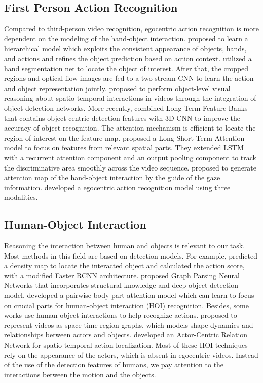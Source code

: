 \documentclass[letterpaper]{article} \usepackage{aaai20}  \usepackage{times}  \usepackage{helvet} \usepackage{courier}  \usepackage[hyphens]{url}  \usepackage{graphicx} \urlstyle{rm} \def\UrlFont{\rm}  \usepackage{graphicx}  \frenchspacing  \setlength{\pdfpagewidth}{8.5in}  \setlength{\pdfpageheight}{11in}  \usepackage{amsfonts,amssymb}
\begin{document}
\subsection{First Person Action Recognition}
Compared to third-person video recognition, egocentric action recognition is more dependent on the modeling of the hand-object interaction.  \cite{fathi2011understanding} proposed to learn a hierarchical model which exploits the consistent appearance of objects, hands, and actions and refines the object prediction based on action context.  \cite{ma2016going} utilized a hand segmentation net to locate the object of interest. After that, the cropped regions and optical flow images are fed to a two-stream CNN to learn the action and object representation jointly. \cite{Baradel2018ObjectLV} proposed to perform object-level visual reasoning about spatio-temporal interactions in videos through the integration of object detection networks.  More recently, \cite{Wu2018LongTermFB} combined Long-Term Feature Banks that contains object-centric detection features with 3D CNN to improve the accuracy of object recognition. The attention mechanism is efficient to locate the region of interest on the feature map.   \cite{Sudhakaran_2019_CVPR} proposed a Long Short-Term Attention model to focus on features from relevant spatial parts. They extended LSTM with a recurrent attention component and an output pooling component to track the discriminative area smoothly across the video sequence.  \cite{li2018eye} proposed to generate attention map of the hand-object interaction by the guide of the gaze information.  \cite{Kazakos_2019_ICCV} developed a egocentric action recognition model using three modalities.

\subsection{Human-Object Interaction}
Reasoning the interaction between human and objects is relevant to our task. Most methods in this field are based on detection models. For example,  \cite{gkioxari2018detecting} predicted a density map to locate the interacted object and calculated the action score, with a modified Faster RCNN architecture. \cite{qi2018learning} proposed Graph Parsing Neural Networks that incorporates structural knowledge and deep object detection model.  \cite{fang2018pairwise} developed a pairwise body-part attention model which can learn to focus on crucial parts for human-object interaction (HOI) recognition.  
Besides, some works use human-object interactions to help recognize actions.  \cite{wang2018videos} proposed to represent videos as space-time region graphs, which models shape dynamics and relationships between actors and objects.  \cite{sun2018actor} developed an Actor-Centric Relation Network for spatio-temporal action localization.
Most of these HOI techniques rely on the appearance of the actors, which is absent in egocentric videos. Instead of the use of the detection features of humans, we pay attention to the interactions between the motion and the objects.
\end{document}
